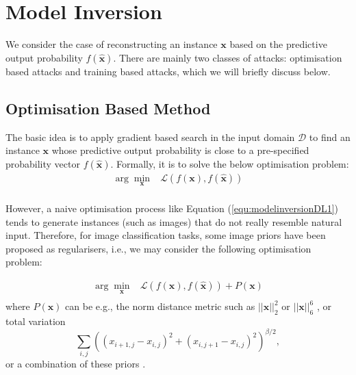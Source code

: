 \section{Model Inversion}\label{sec:modelInversionDL}

We consider the case of reconstructing an instance $\textbf{x}$ based on the predictive output probability $f(\hat{\textbf{x}})$. There are mainly two classes of attacks: optimisation based attacks and training based attacks, which we will briefly discuss below.

\subsection{Optimisation Based Method}

The basic idea is to apply gradient based search in the input domain $\mathcal{D}$ to find an instance ${\textbf{x}}$ whose predictive output probability is close to a pre-specified probability vector $f(\hat{\textbf{x}})$. Formally, it is to solve the below optimisation problem: 
\begin{equation}\label{equ:modelinversionDL1}
    \begin{array}{rl}
        \arg\min_{\textbf{x}} & \mathcal{L}(f(\textbf{x}),f(\hat{\textbf{x}})) \\
    \end{array}
\end{equation}

However,  a naive optimisation process like Equation (\ref{equ:modelinversionDL1}) tends to generate instances (such as images) that do not really resemble natural input. Therefore, for image classification tasks, some image priors have been proposed as regularisers, i.e., we may consider the following optimisation problem: 

\begin{equation}
    \begin{array}{rl}
        \arg\min_{\textbf{x}} & \mathcal{L}(f(\textbf{x}),f(\hat{\textbf{x}})) + P(\textbf{x}) \\
    \end{array}
\end{equation}
where $P(\textbf{x})$ can be e.g., the norm distance metric such as $||\textbf{x}||_2^2$ \cite{DBLP:journals/corr/SimonyanVZ13} or $||\textbf{x}||_6^6$ \cite{DBLP:conf/cvpr/MahendranV15}, or total variation \cite{DBLP:conf/cvpr/MahendranV15}
\begin{equation}
    \sum_{i,j} ((x_{i+1,j}-x_{i,j})^2+(x_{i,j+1}-x_{i,j})^2)^{\beta/2}, 
\end{equation}
or a combination of these priors \cite{DBLP:journals/corr/YosinskiCNFL15}. 


